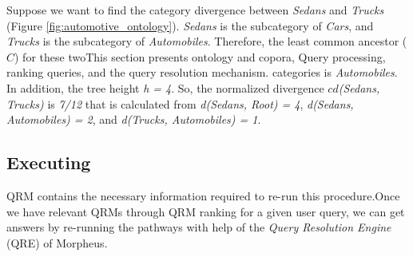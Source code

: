 Suppose we want to find the category divergence between \textit{Sedans}
and \textit{Trucks} (Figure \ref{fig:automotive_ontology}). 
\textit{Sedans} is the subcategory of \textit{Cars}, and \textit{Trucks}
is the subcategory of \textit{Automobiles}. Therefore, the least common ancestor ($C$)
for these twoThis section presents ontology and copora, Query processing, ranking queries, and the query resolution mechanism. categories is \textit{Automobiles}. In addition, the tree height \textit{h = 4}.
So, the normalized divergence $cd$\textit{(Sedans, Trucks)} is \textit{7/12}
that is calculated from \textit{d(Sedans, Root) = 4}, \textit{d(Sedans, Automobiles) = 2}, and \textit{d(Trucks, Automobiles) = 1}.


\subsection{Executing} 

QRM contains the necessary  
information required to re-run this procedure.Once we have 
relevant QRMs through QRM ranking for a given user query, we can  
get answers by re-running the pathways with help of 
the \emph{Query Resolution Engine} (QRE) of Morpheus. 


  



